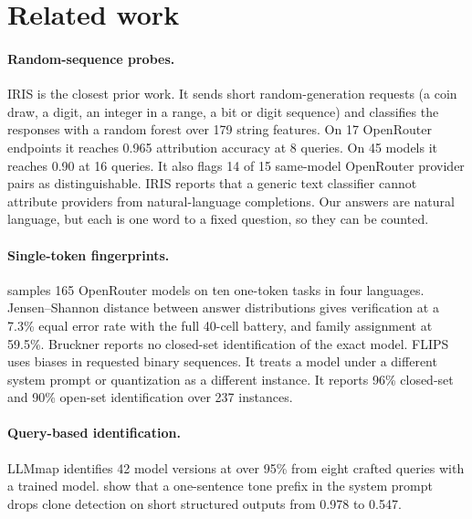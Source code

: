 \documentclass[11pt]{article}
\begin{document}
\section{Related work}
\label{sec:related}

\paragraph{Random-sequence probes.} IRIS \citep{zhang2026iris} is the closest prior work. It sends
short random-generation requests (a coin draw, a digit, an integer in a range, a bit or digit
sequence) and classifies the responses with a random forest over 179 string features. On 17
OpenRouter endpoints it reaches 0.965 attribution accuracy at 8 queries. On 45 models it reaches
0.90 at 16 queries. It also flags 14 of 15 same-model OpenRouter provider pairs as
distinguishable. IRIS reports that a generic text classifier cannot attribute providers from
natural-language completions. Our answers are natural language, but each is one word to a fixed
question, so they can be counted.

\paragraph{Single-token fingerprints.} \citet{bruckner2026onetoken} samples 165 OpenRouter models
on ten one-token tasks in four languages. Jensen--Shannon distance between answer distributions
gives verification at a 7.3\% equal error rate with the full 40-cell battery, and family
assignment at 59.5\%. Bruckner reports no closed-set identification of the exact model. FLIPS
\citep{richardeau2026flips} uses biases in requested binary sequences. It treats a model under a
different system prompt or quantization as a different instance. It reports 96\% closed-set and
90\% open-set identification over 237 instances.

\paragraph{Query-based identification.} LLMmap \citep{pasquini2025llmmap} identifies 42 model
versions at over 95\% from eight crafted queries with a trained model. \citet{chen2026sysprompt}
show that a one-sentence tone prefix in the system prompt drops clone detection on short
structured outputs from 0.978 to 0.547.
\end{document}

